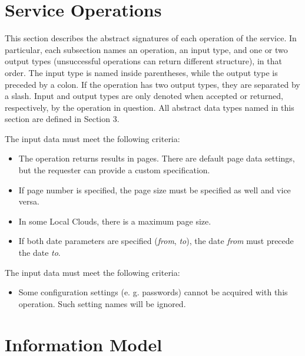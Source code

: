 \documentclass[a4paper]{arrowhead}
\begin{document}
\newpage

\section{Service Operations}
\label{sec:functions}

This section describes the abstract signatures of each operation of the service. 
In particular, each subsection names an operation, an input type, and one or two output types (unsuccessful operations can return different structure), in that order.
The input type is named inside parentheses, while the output type is preceded by a colon. If the operation has two output types, they are separated by a slash.
Input and output types are only denoted when accepted or returned, respectively, by the operation in question. All abstract data types named in this section are defined in Section 3.

{}

The input data must meet the following criteria:

\begin{itemize}
    \item The operation returns results in pages. There are default page data settings, but the requester can provide a custom specification.
    \item If page number is specified, the page size must be specified as well and vice versa.
    \item In some Local Clouds, there is a maximum page size.
    \item If both date parameters are specified (\textit{from}, \textit{to}), the date \textit{from} must precede the date \textit{to}.
\end{itemize}


The input data must meet the following criteria:

\begin{itemize}
    \item Some configuration settings (e. g. passwords) cannot be acquired with this operation. Such setting names will be ignored.
\end{itemize}

\clearpage

\section{Information Model}
\label{sec:model}
\end{document}
